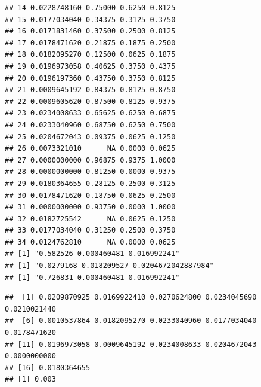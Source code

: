 \documentclass[]{article}
\begin{document}
\begin{verbatim}
## 14 0.0228748160 0.75000 0.6250 0.8125
## 15 0.0177034040 0.34375 0.3125 0.3750
## 16 0.0171831460 0.37500 0.2500 0.8125
## 17 0.0178471620 0.21875 0.1875 0.2500
## 18 0.0182095270 0.12500 0.0625 0.1875
## 19 0.0196973058 0.40625 0.3750 0.4375
## 20 0.0196197360 0.43750 0.3750 0.8125
## 21 0.0009645192 0.84375 0.8125 0.8750
## 22 0.0009605620 0.87500 0.8125 0.9375
## 23 0.0234008633 0.65625 0.6250 0.6875
## 24 0.0233040960 0.68750 0.6250 0.7500
## 25 0.0204672043 0.09375 0.0625 0.1250
## 26 0.0073321010      NA 0.0000 0.0625
## 27 0.0000000000 0.96875 0.9375 1.0000
## 28 0.0000000000 0.81250 0.0000 0.9375
## 29 0.0180364655 0.28125 0.2500 0.3125
## 30 0.0178471620 0.18750 0.0625 0.2500
## 31 0.0000000000 0.93750 0.0000 1.0000
## 32 0.0182725542      NA 0.0625 0.1250
## 33 0.0177034040 0.31250 0.2500 0.3750
## 34 0.0124762810      NA 0.0000 0.0625
## [1] "0.582526 0.000460481 0.016992241"
## [1] "0.0279168 0.018209527 0.0204672042887984"
## [1] "0.726831 0.000460481 0.016992241"
\end{verbatim}

\begin{verbatim}
##  [1] 0.0209870925 0.0169922410 0.0270624800 0.0234045690 0.0210021440
##  [6] 0.0010537864 0.0182095270 0.0233040960 0.0177034040 0.0178471620
## [11] 0.0196973058 0.0009645192 0.0234008633 0.0204672043 0.0000000000
## [16] 0.0180364655
## [1] 0.003
\end{verbatim}
\end{document}
